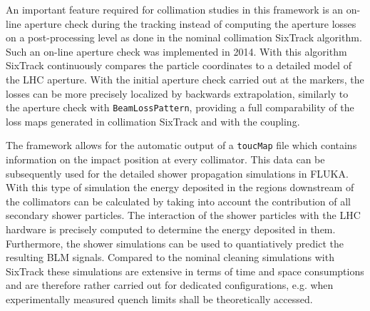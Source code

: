 An important feature required for collimation studies in this framework is an on-line aperture check during the tracking instead of computing the aperture losses on a post-processing level as done in the nominal collimation SixTrack algorithm. Such an on-line aperture check was implemented in 2014. With this algorithm SixTrack continuously compares the particle coordinates to a detailed model of the LHC aperture. With the initial aperture check carried out at the markers, the losses can be more precisely localized by backwards extrapolation, similarly to the aperture check with \texttt{BeamLossPattern}, providing a full comparability of the loss maps generated in collimation SixTrack and with the coupling.

The framework allows for the automatic output of a \texttt{toucMap} file which contains information on the impact position at every collimator. This data can be subsequently used for the detailed shower propagation simulations in FLUKA. With this type of simulation the energy deposited in the regions downstream of the collimators can be calculated by taking into account the contribution of all secondary shower particles. The interaction of the shower particles with the LHC hardware is precisely computed to determine the energy deposited in them. Furthermore, the shower simulations can be used to quantiatively predict the resulting BLM signals. Compared to the nominal cleaning simulations with SixTrack these simulations are extensive in terms of time and space consumptions and are therefore rather carried out for dedicated configurations, e.g. when experimentally measured quench limits shall be theoretically accessed.


